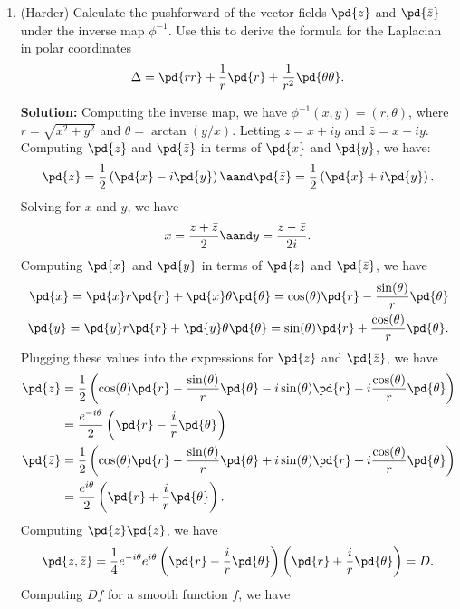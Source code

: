 \documentclass[notitlepage]{report}
\begin{document}
\begin{enumerate}
    \item (Harder) Calculate the pushforward of the vector fields $\pd{z}$ and $\pd{\bar{z}}$ under the inverse map $\phi^{-1}$. Use this to derive the formula for the Laplacian in polar coordinates
      \[%
        \Delta = \pd{rr} + \frac{1}{r} \pd{r} + \frac{1}{r^2} \pd{\theta\theta}
      .\]%

      \textbf{Solution:} Computing the inverse map, we have $\phi^{-1}(x, y) = (r, \theta)$, where $r = \sqrt{x^2 + y^2}$ and $\theta = \arctan(y/x)$. Letting $z = x + iy$ and $\bar{z} = x - iy$. Computing $\pd{z}$ and $\pd{\bar{z}}$ in terms of $\pd{x}$ and $\pd{y}$, we have:
      \[%
        \pd{z} = \frac{1}{2} \left(\pd{x} - i\pd{y}\right) \aand \pd{\bar{z}} = \frac{1}{2} \left(\pd{x} + i\pd{y}\right)
      .\]%
      Solving for $x$ and $y$, we have
      \begin{align*}
        x = \frac{z + \bar{z}}{2} \aand y = \frac{z - \bar{z}}{2i}
      .\end{align*}
      Computing $\pd{x}$ and $\pd{y}$ in terms of $\pd{z}$ and $\pd{\bar{z}}$, we have
      \begin{align*}
        \pd{x} = \pd{x} r \pd{r} + \pd{x} \theta \pd{\theta} = \cos(\theta) \pd{r} - \frac{\sin(\theta)}{r} \pd{\theta} \\
        \pd{y} = \pd{y} r \pd{r} + \pd{y} \theta \pd{\theta} = \sin(\theta) \pd{r} + \frac{\cos(\theta)}{r} \pd{\theta}
      .\end{align*}
      Plugging these values into the expressions for $\pd{z}$ and $\pd{\bar{z}}$, we have
      \begin{align*}
        \pd{z} &= \frac{1}{2} \left(\cos(\theta) \pd{r} - \frac{\sin(\theta)}{r} \pd{\theta} - i\sin(\theta) \pd{r} - i\frac{\cos(\theta)}{r} \pd{\theta}\right) \\
               &= \frac{e^{-i\theta}}{2} \left(\pd{r} - \frac{i}{r} \pd{\theta}\right) \\
        \pd{\bar{z}} &= \frac{1}{2} \left(\cos(\theta) \pd{r} - \frac{\sin(\theta)}{r} \pd{\theta} + i\sin(\theta) \pd{r} + i\frac{\cos(\theta)}{r} \pd{\theta}\right) \\
                     &= \frac{e^{i\theta}}{2} \left(\pd{r} + \frac{i}{r} \pd{\theta}\right)
      .\end{align*}
      Computing $\pd{z} \pd{\bar{z}}$, we have
      \[%
        \pd{z,\bar{z}} = \frac{1}{4} e^{-i\theta} e^{i\theta} \left(\pd{r} - \frac{i}{r} \pd{\theta}\right)\left(\pd{r} + \frac{i}{r} \pd{\theta}\right) = D
      .\]%
      Computing $Df$ for a smooth function $f$, we have

\end{enumerate}
\end{document}
